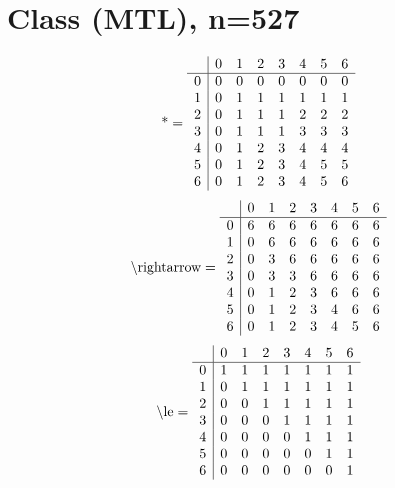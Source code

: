 \documentclass[11pt]{article}
\begin{document}
\section{Class (MTL), n=527}
\[\text{*} = 
\begin{array}{r | r r r r r r r}
 & 0 & 1 & 2 & 3 & 4 & 5 & 6 \\ \hline
0 & 0 & 0 & 0 & 0 & 0 & 0 & 0 \\
1 & 0 & 1 & 1 & 1 & 1 & 1 & 1 \\
2 & 0 & 1 & 1 & 1 & 2 & 2 & 2 \\
3 & 0 & 1 & 1 & 1 & 3 & 3 & 3 \\
4 & 0 & 1 & 2 & 3 & 4 & 4 & 4 \\
5 & 0 & 1 & 2 & 3 & 4 & 5 & 5 \\
6 & 0 & 1 & 2 & 3 & 4 & 5 & 6 \\
\end{array}
\]
\[\text{\textbackslash rightarrow} = 
\begin{array}{r | r r r r r r r}
 & 0 & 1 & 2 & 3 & 4 & 5 & 6 \\ \hline
0 & 6 & 6 & 6 & 6 & 6 & 6 & 6 \\
1 & 0 & 6 & 6 & 6 & 6 & 6 & 6 \\
2 & 0 & 3 & 6 & 6 & 6 & 6 & 6 \\
3 & 0 & 3 & 3 & 6 & 6 & 6 & 6 \\
4 & 0 & 1 & 2 & 3 & 6 & 6 & 6 \\
5 & 0 & 1 & 2 & 3 & 4 & 6 & 6 \\
6 & 0 & 1 & 2 & 3 & 4 & 5 & 6 \\
\end{array}
\]
\[\text{\textbackslash le} = 
\begin{array}{r | r r r r r r r}
 & 0 & 1 & 2 & 3 & 4 & 5 & 6 \\ \hline
0 & 1 & 1 & 1 & 1 & 1 & 1 & 1 \\
1 & 0 & 1 & 1 & 1 & 1 & 1 & 1 \\
2 & 0 & 0 & 1 & 1 & 1 & 1 & 1 \\
3 & 0 & 0 & 0 & 1 & 1 & 1 & 1 \\
4 & 0 & 0 & 0 & 0 & 1 & 1 & 1 \\
5 & 0 & 0 & 0 & 0 & 0 & 1 & 1 \\
6 & 0 & 0 & 0 & 0 & 0 & 0 & 1 \\
\end{array}
\]
\end{document}
